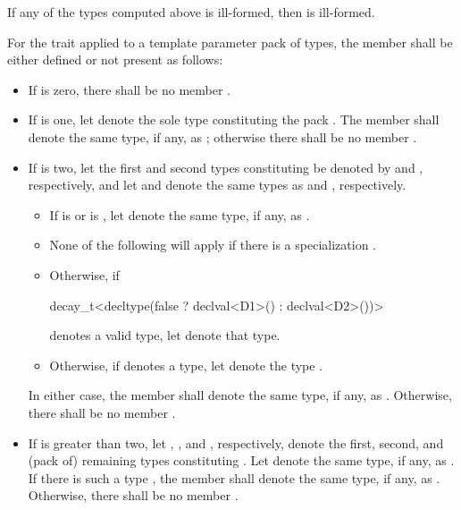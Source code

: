 If any of the types computed above is ill-formed, then
 is ill-formed.

\pnum
For the  trait applied to a template parameter pack  of types,
the member  shall be either defined or not present as follows:

\begin{itemize}
\item If  is zero, there shall be no member .

\item If  is one, let  denote the sole type
constituting the pack .
The member   shall denote the same
type, if any, as ;
otherwise there shall be no member .

\item If  is two,
let the first and second types constituting  be denoted
by  and , respectively, and
let  and  denote
the same types as  and , respectively.
  \begin{itemize}
  \item If  is  or
      is ,
     let  denote the same type, if any,
     as .
  \item
    \begin{note}
      None of the following will apply if there is a specialization
      .
    \end{note}
  \item Otherwise, if
\begin{codeblock}
decay_t<decltype(false ? declval<D1>() : declval<D2>())>
\end{codeblock}
    denotes a valid type, let  denote that type.
  \item Otherwise, if
    denotes a type, let  denote the type
    .
  \end{itemize}
In either case, the member   shall denote
the same type, if any, as .
Otherwise, there shall be no member .

\item If  is greater than two,
let , , and , respectively,
denote the first, second, and (pack of) remaining types constituting .
Let  denote the same type, if any, as .
If there is such a type , the member  
shall denote the same type, if any, as .
Otherwise, there shall be no member .
\end{itemize}


